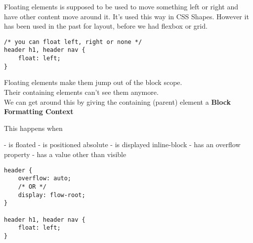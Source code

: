 Floating elements is supposed to be used to move something left or right and have other content move around it. It's used this way in CSS Shapes. However it has been used in the past for layout, before we had flexbox or grid.

\begin{verbatim}
/* you can float left, right or none */
header h1, header nav {
    float: left;
}
\end{verbatim}

Floating elements make them jump out of the block scope.
\\
Their containing elements can't see them anymore.
\\
We can get around this by giving the containing (parent) element a \textbf{Block Formatting Context}

This happens when

- is floated
- is positioned absolute
- is displayed inline-block
- has an overflow property
- has a value other than visible


\begin{verbatim}
header {
    overflow: auto;
    /* OR */
    display: flow-root;
}

header h1, header nav {
    float: left;
}
\end{verbatim}
